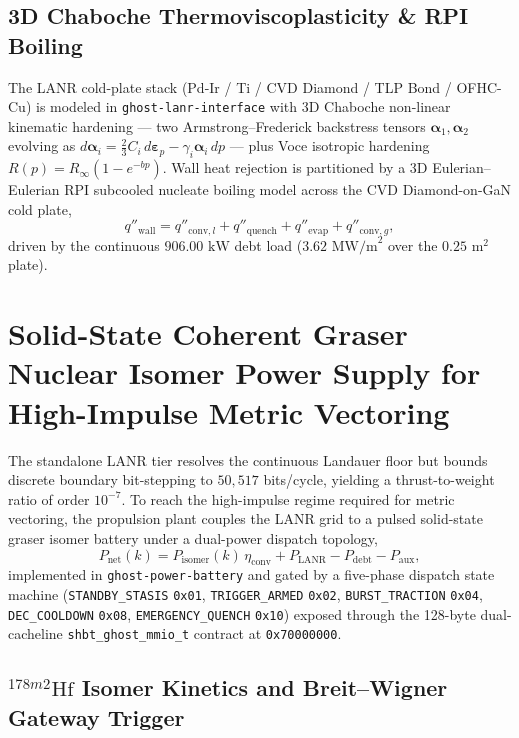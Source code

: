 \documentclass[twocolumn,aps,pra,floatfix,superscriptaddress,10pt]{revtex4-2}
\begin{document}
\subsection{3D Chaboche Thermoviscoplasticity \& RPI Boiling}

The LANR cold-plate stack (Pd-Ir / Ti / CVD Diamond / TLP Bond / OFHC-Cu) is modeled in \texttt{ghost-lanr-interface} with 3D Chaboche non-linear kinematic hardening --- two Armstrong--Frederick backstress tensors $\boldsymbol{\alpha}_1, \boldsymbol{\alpha}_2$ evolving as $d\boldsymbol{\alpha}_i = \tfrac{2}{3}C_i\, d\boldsymbol{\varepsilon}_p - \gamma_i \boldsymbol{\alpha}_i\, dp$ --- plus Voce isotropic hardening $R(p) = R_\infty (1 - e^{-bp})$. Wall heat rejection is partitioned by a 3D Eulerian--Eulerian RPI subcooled nucleate boiling model across the CVD Diamond-on-GaN cold plate,
\begin{equation}
q''_{\text{wall}} = q''_{\text{conv},l} + q''_{\text{quench}} + q''_{\text{evap}} + q''_{\text{conv},g} ,
\end{equation}
driven by the continuous $906.00\text{ kW}$ debt load ($3.62\text{ MW/m}^2$ over the $0.25\text{ m}^2$ plate).

\section{Solid-State Coherent Graser Nuclear Isomer Power Supply for High-Impulse Metric Vectoring}

The standalone LANR tier resolves the continuous Landauer floor but bounds discrete boundary bit-stepping to $50{,}517$ bits/cycle, yielding a thrust-to-weight ratio of order $10^{-7}$. To reach the high-impulse regime required for metric vectoring, the propulsion plant couples the LANR grid to a pulsed solid-state graser isomer battery under a dual-power dispatch topology,
\begin{equation}
P_{\text{net}}(k) = P_{\text{isomer}}(k)\,\eta_{\text{conv}} + P_{\text{LANR}} - P_{\text{debt}} - P_{\text{aux}} ,
\end{equation}
implemented in \texttt{ghost-power-battery} and gated by a five-phase dispatch state machine (\texttt{STANDBY\_STASIS} \texttt{0x01}, \texttt{TRIGGER\_ARMED} \texttt{0x02}, \texttt{BURST\_TRACTION} \texttt{0x04}, \texttt{DEC\_COOLDOWN} \texttt{0x08}, \texttt{EMERGENCY\_QUENCH} \texttt{0x10}) exposed through the 128-byte dual-cacheline \texttt{shbt\_ghost\_mmio\_t} contract at \texttt{0x70000000}.

\subsection{$^{178m2}\mathrm{Hf}$ Isomer Kinetics and Breit--Wigner Gateway Trigger}
\end{document}
